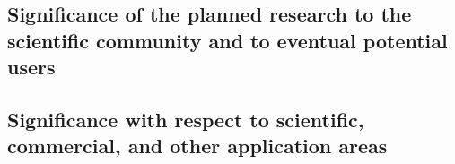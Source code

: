 \documentclass[11pt,a4paper]{article}
\begin{document}

\subsection{Significance of the planned research to the scientific
  community and to eventual potential users}
\label{sec:sign}


\subsection{Significance with respect to scientific, commercial, and
  other application areas}
\label{sec:sign2}

\nocite{hens:05,cale:05,gbgk:05,vslk:09}



\end{document}
